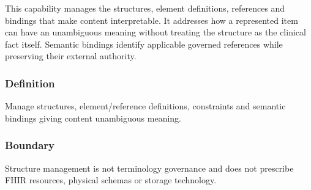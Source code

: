 This capability manages the structures, element definitions, references and bindings that make content interpretable. It addresses how a represented item can have an unambiguous meaning without treating the structure as the clinical fact itself. Semantic bindings identify applicable governed references while preserving their external authority.

\subsubsection*{Definition}

Manage structures, element/\allowbreak{}reference definitions, constraints and semantic bindings giving content unambiguous meaning.

\subsubsection*{Boundary}

Structure management is not terminology governance and does not prescribe FHIR resources, physical schemas or storage technology.

